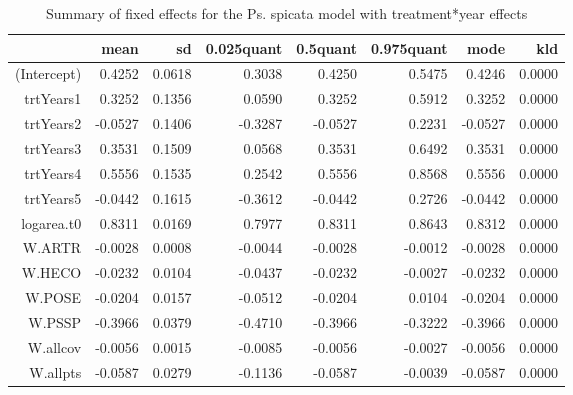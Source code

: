 \begin{table}[ht]
\centering
\caption{Summary of fixed effects for the Ps. spicata model with treatment*year effects} 
\label{PSSPgrowth-trtYears}
\begin{tabular}{rrrrrrrr}
  \hline
 & mean & sd & 0.025quant & 0.5quant & 0.975quant & mode & kld \\ 
  \hline
(Intercept) & 0.4252 & 0.0618 & 0.3038 & 0.4250 & 0.5475 & 0.4246 & 0.0000 \\ 
  trtYears1 & 0.3252 & 0.1356 & 0.0590 & 0.3252 & 0.5912 & 0.3252 & 0.0000 \\ 
  trtYears2 & -0.0527 & 0.1406 & -0.3287 & -0.0527 & 0.2231 & -0.0527 & 0.0000 \\ 
  trtYears3 & 0.3531 & 0.1509 & 0.0568 & 0.3531 & 0.6492 & 0.3531 & 0.0000 \\ 
  trtYears4 & 0.5556 & 0.1535 & 0.2542 & 0.5556 & 0.8568 & 0.5556 & 0.0000 \\ 
  trtYears5 & -0.0442 & 0.1615 & -0.3612 & -0.0442 & 0.2726 & -0.0442 & 0.0000 \\ 
  logarea.t0 & 0.8311 & 0.0169 & 0.7977 & 0.8311 & 0.8643 & 0.8312 & 0.0000 \\ 
  W.ARTR & -0.0028 & 0.0008 & -0.0044 & -0.0028 & -0.0012 & -0.0028 & 0.0000 \\ 
  W.HECO & -0.0232 & 0.0104 & -0.0437 & -0.0232 & -0.0027 & -0.0232 & 0.0000 \\ 
  W.POSE & -0.0204 & 0.0157 & -0.0512 & -0.0204 & 0.0104 & -0.0204 & 0.0000 \\ 
  W.PSSP & -0.3966 & 0.0379 & -0.4710 & -0.3966 & -0.3222 & -0.3966 & 0.0000 \\ 
  W.allcov & -0.0056 & 0.0015 & -0.0085 & -0.0056 & -0.0027 & -0.0056 & 0.0000 \\ 
  W.allpts & -0.0587 & 0.0279 & -0.1136 & -0.0587 & -0.0039 & -0.0587 & 0.0000 \\ 
   \hline
\end{tabular}
\end{table}

